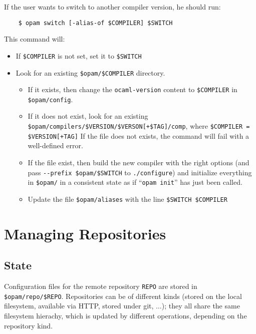 \documentclass[a4paper,10pt]{article}
\begin{document}
If the user wants to switch to another compiler version, he should run:

\begin{verbatim}
    $ opam switch [-alias-of $COMPILER] $SWITCH
\end{verbatim}

This command will:

\begin{itemize}

\item If \verb+$COMPILER+ is not set, set it to \verb+$SWITCH+

\item Look for an existing \verb+$opam/$COMPILER+ directory.

\begin{itemize}
\item If it
  exists, then change the {\tt ocaml-version} content to
  \verb+$COMPILER+ in  \verb+$opam/config+.

\item If it does not exist, look for an existing
  \verb|$opam/compilers/$VERSION/$VERSON[+$TAG]/comp|, where
  \verb|$COMPILER = $VERSION[+TAG]| If the file does not exists, the
  command will fail with a well-defined error.

\item If the file exist, then build the new compiler with the right
  options (and pass \verb+--prefix $opam/$SWITCH+ to
  \verb+./configure+) and initialize everything in \verb+$opam/+
  in a consistent state as if ``\verb+opam init+'' has just been called.

\item Update the file \verb+$opam/aliases+ with the line
  \verb+$SWITCH $COMPILER+

\end{itemize}

\end{itemize}

\section{Managing Repositories}
\label{section:repositories}

\subsection{State}
\label{state-repo}

Configuration files for the remote repository \verb+REPO+ are stored in
\verb+$opam/repo/$REPO+. Repositories can be of different kinds
(stored on the local filesystem, available via HTTP, stored under git,
$\ldots$); they all share the same filesystem hierachy, which is
updated by different operations, depending on the repository kind.
\end{document}

